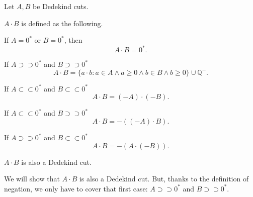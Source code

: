 \begin{theorem}[Multiplication]
    \par Let $A, B$ be Dedekind cuts.
    \par $A\cdot B$ is defined as the following.
    \par If $A = {0}^{*}$ or $B = {0}^{*}$, then
    \[
        A\cdot B = {0}^{*}.
    \]
    \par If $A\supset\supset{0}^{*}$ and $B\supset\supset{0}^{*}$
    \[
        A\cdot B = \{ a\cdot b : a\in A\wedge a\ge 0 \wedge b\in B\wedge b\ge 0 \} \cup \mathbb{Q}^{-}.
    \]
    \par If $A\subset\subset{0}^{*}$ and $B\subset\subset{0}^{*}$
    \[
        A\cdot B = (-A)\cdot (-B).
    \]
    \par If $A\subset\subset{0}^{*}$ and $B\supset\supset{0}^{*}$
    \[
        A\cdot B = -\left((-A)\cdot B\right).
    \]
    \par If $A\supset\supset{0}^{*}$ and $B\subset\subset{0}^{*}$
    \[
        A\cdot B = -\left(A\cdot (-B)\right).
    \]
    \par $A\cdot B$ is also a Dedekind cut.
\end{theorem}

\par We will show that $A\cdot B$ is also a Dedekind cut. But, thanks to the definition of negation, we only have to cover that first case: $A\supset\supset{0}^{*}$ and $B\supset\supset{0}^{*}$.


